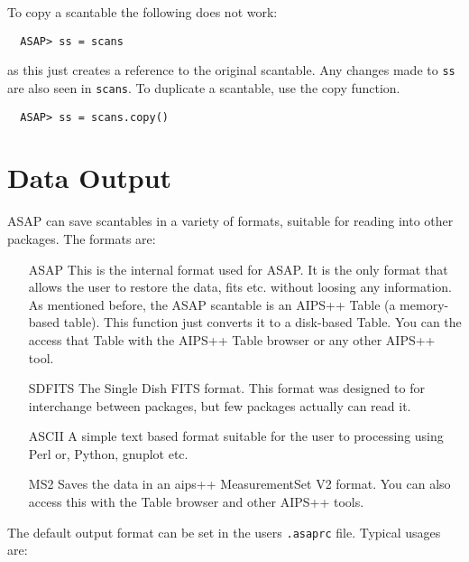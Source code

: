\documentclass[11pt]{article}
\newcommand{\cmd}[1]{{\tt #1}}
\begin{document}
To copy a scantable the following does not work:

\begin{verbatim}
  ASAP> ss = scans
\end{verbatim}

as this just creates a reference to the original scantable. Any
changes made to \cmd{ss} are also seen in \cmd{scans}. To duplicate a
scantable, use the copy function.

\begin{verbatim}
  ASAP> ss = scans.copy()
\end{verbatim}

\section{Data Output}

ASAP can save scantables in a
variety of formats, suitable for reading into other packages. The
formats are:

\begin{itemize}
\item[ASAP] This is the internal format used for ASAP. It is the only
  format that allows the user to restore the data, fits etc. without
  loosing any information.  As mentioned before, the ASAP scantable is
  an AIPS++ Table (a memory-based table).  This function just converts
  it to a disk-based Table.  You can the access that Table with the
  AIPS++ Table browser or any other AIPS++ tool.

\item[SDFITS] The Single Dish FITS format. This format was designed to
  for interchange between packages, but few packages actually can read
  it.


\item[ASCII] A simple text based format suitable for the user to
processing using Perl or, Python, gnuplot etc.

\item[MS2] Saves the data in an aips++ MeasurementSet V2 format.
You can also access this with the Table browser and other AIPS++
tools.

\end{itemize}

The default output format can be set in the users {\tt .asaprc} file.
Typical usages are:
\end{document}
